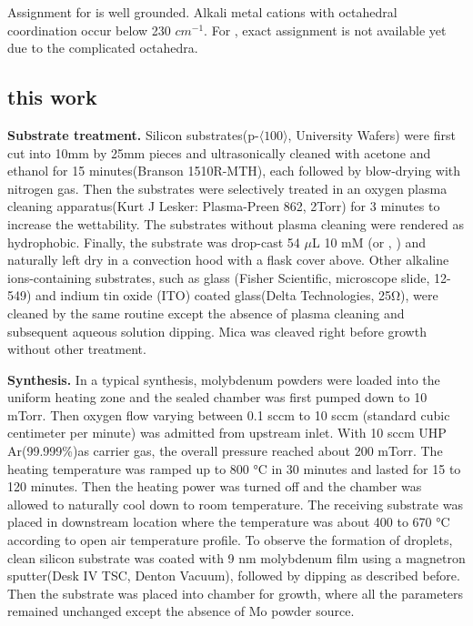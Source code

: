 Assignment for  is well grounded. Alkali metal cations with octahedral coordination occur below 230 $cm^{-1}$. For , exact assignment is not available yet due to the complicated  octahedra.


\subsection{this work}
\textbf{Substrate treatment.} Silicon substrates(p-$\langle100\rangle$, University Wafers) were first cut into 10mm by 25mm pieces and ultrasonically cleaned with acetone and ethanol for 15 minutes(Branson 1510R-MTH), each followed by blow-drying with nitrogen gas. Then the substrates were selectively treated in an oxygen plasma cleaning apparatus(Kurt J Lesker: Plasma-Preen 862, 2Torr) for 3 minutes to increase the wettability. The substrates without plasma cleaning were rendered as hydrophobic. Finally, the substrate was drop-cast 54 $\mu$L 10 mM  (or , ) and naturally left dry in a convection hood with a flask cover above. Other alkaline ions-containing substrates, such as glass (Fisher Scientific, microscope slide, 12-549) and indium tin oxide (ITO) coated glass(Delta Technologies, 25\si{\ohm}), were cleaned by the same routine except the absence of plasma cleaning and subsequent aqueous solution dipping. Mica was cleaved right before growth without other treatment.

\textbf{Synthesis.} In a typical synthesis, molybdenum powders were loaded into the uniform heating zone and the sealed chamber was first pumped down to 10 mTorr. Then oxygen flow varying between 0.1 sccm to 10 sccm (standard cubic centimeter per minute) was admitted from upstream inlet. With 10 sccm UHP Ar(99.999\%)as carrier gas, the overall pressure reached about 200 mTorr. The heating temperature was ramped up to 800 \si{\degreeCelsius} in 30 minutes and lasted for 15 to 120 minutes. Then the heating power was turned off and the chamber was allowed to naturally cool down to room temperature. The receiving substrate was placed in downstream location where the temperature was about 400 to 670 \si{\degreeCelsius} according to open air temperature profile. To observe the formation of droplets, clean silicon substrate was coated with 9 nm molybdenum film using a magnetron sputter(Desk IV TSC, Denton Vacuum), followed by  dipping as described before. Then the substrate was placed into chamber for growth, where all the parameters remained unchanged except the absence of Mo powder source.

